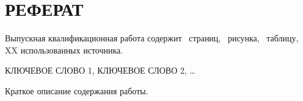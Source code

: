 \chapter*{РЕФЕРАТ}









%
%

\par
Выпускная квалификационная работа содержит \pageref*{LastPage}~страниц, \totfig~рисунка,                                        \tottab~таблицу, XX использованных источника.
\bigskip

\par
КЛЮЧЕВОЕ СЛОВО 1, КЛЮЧЕВОЕ СЛОВО 2, …
\bigskip


\par
Краткое описание содержания работы.


